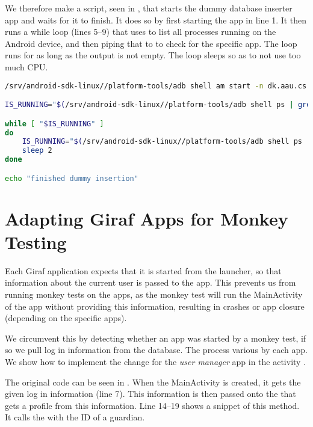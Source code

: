 We therefore make a script, seen in , that starts the dummy database inserter app and waits for it to finish. It does so by first starting the app in line 1. It then runs a while loop (lines 5--9) that uses  to list all processes running on the Android device, and then piping that to  to check for the specific app. The loop runs for as long as the output is not empty. The loop sleeps so as to not use too much CPU.

\begin{lstlisting}[language=bash,showstringspaces=false,caption=Start and wait for dummy database inserter,label=lst:start_wait_dummy_db_inserter]
/srv/android-sdk-linux//platform-tools/adb shell am start -n dk.aau.cs.giraf.dummydbinserter/dk.aau.cs.giraf.dummydbinserter.MainActivity

IS_RUNNING="$(/srv/android-sdk-linux//platform-tools/adb shell ps | grep dk.aau.cs.giraf.dummydbinserter)"

while [ "$IS_RUNNING" ]
do
    IS_RUNNING="$(/srv/android-sdk-linux//platform-tools/adb shell ps | grep dk.aau.cs.giraf.dummydbinserter)"
    sleep 2
done

echo "finished dummy insertion"
\end{lstlisting}

\section{Adapting Giraf Apps for Monkey Testing}
Each Giraf application expects that it is started from the launcher, so that information about the current user is passed to the app. This prevents us from running monkey tests on the apps, as the monkey test will run the MainActivity of the app without providing this information, resulting in crashes or app closure (depending on the specific apps).

We circumvent this by detecting whether an app was started by a monkey test, if so we pull log in information from the database. The process various by each app. We show how to implement the change for the \emph{user manager} app in the activity .

The original code can be seen in . When the MainActivity is created, it gets the given log in information (line 7). This information is then passed onto the  that gets a profile from this information. Line 14--19 shows a snippet of this method. It calls the  with the ID of a guardian.

